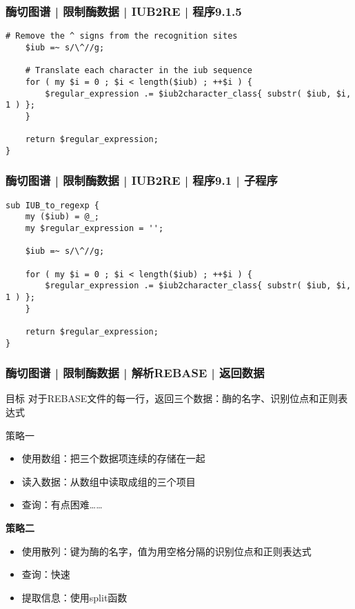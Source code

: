 \begin{frame}[fragile]
  \frametitle{酶切图谱 | 限制酶数据 | IUB2RE | 程序9.1.5}
  \vspace{-1.5em}
\begin{lstlisting}[firstnumber=46]
    # Remove the ^ signs from the recognition sites
    $iub =~ s/\^//g;

    # Translate each character in the iub sequence
    for ( my $i = 0 ; $i < length($iub) ; ++$i ) {
        $regular_expression .= $iub2character_class{ substr( $iub, $i, 1 ) };
    }

    return $regular_expression;
}
\end{lstlisting}
\end{frame}

\begin{frame}[fragile]
  \frametitle{酶切图谱 | 限制酶数据 | IUB2RE | 程序9.1 | \alert{子程序}}
  \vspace{-1.5em}
\begin{lstlisting}
sub IUB_to_regexp {
    my ($iub) = @_;
    my $regular_expression = '';

    $iub =~ s/\^//g;

    for ( my $i = 0 ; $i < length($iub) ; ++$i ) {
        $regular_expression .= $iub2character_class{ substr( $iub, $i, 1 ) };
    }

    return $regular_expression;
}
\end{lstlisting}
\end{frame}

\begin{frame}
  \frametitle{酶切图谱 | 限制酶数据 | 解析REBASE | 返回数据}
  \begin{block}{目标}
    对于REBASE文件的每一行，返回三个数据：酶的名字、识别位点和正则表达式
  \end{block}
  \pause
  \begin{block}{策略一}
    \begin{itemize}
      \item 使用数组：把三个数据项连续的存储在一起
      \item 读入数据：从数组中读取成组的三个项目
      \item 查询：有点困难……
    \end{itemize}
  \end{block}
  \pause
  \begin{block}{\textbf{策略二}}
    \begin{itemize}
      \item 使用散列：键为酶的名字，值为用空格分隔的识别位点和正则表达式
      \item 查询：快速
      \item 提取信息：使用split函数
    \end{itemize}
  \end{block}
\end{frame}

